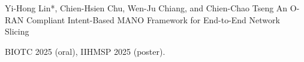 

\begin{cventries}
  
  \cventrypub
  {Yi-Hong Lin*, Chien-Hsien Chu, Wen-Ju Chiang, and Chien-Chao Tseng} %
  {An O-RAN Compliant Intent-Based MANO Framework for End-to-End Network Slicing} %
  {} %
  {} %
  {
    \begin{cvitems} %
      \item {BIOTC 2025 (oral), IIHMSP 2025 (poster).}
    \end{cvitems}
  }

  \end{cventries}